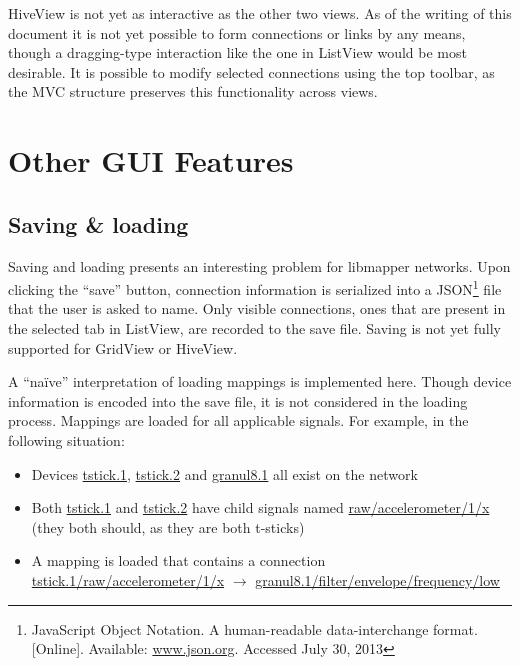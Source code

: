 HiveView is not yet as interactive as the other two views. As of the writing of this document it is not yet possible to form connections or links by any means, though a dragging-type interaction like the one in ListView would be most desirable. It is possible to modify selected connections using the top toolbar, as the MVC structure preserves this functionality across views.



\section{Other GUI Features} %
\label{sec:other_gui_features}

	\subsection{Saving \& loading} %
	\label{sec:saving_and_loading}

Saving and loading presents an interesting problem for libmapper networks. Upon clicking the ``save'' button, connection information is serialized into a JSON\footnote{JavaScript Object Notation. A human-readable data-interchange format. [Online]. Available: \url{www.json.org}. Accessed July 30, 2013} file that the user is asked to name. Only visible connections, ones that are present in the selected tab in ListView, are recorded to the save file. Saving is not yet fully supported for GridView or HiveView.

A ``na\"{i}ve'' interpretation of loading mappings is implemented here. Though device information is encoded into the save file, it is not considered in the loading process. Mappings are loaded for all applicable signals. For example, in the following situation:

\begin{itemize}
	\item Devices \url{tstick.1}, \url{tstick.2} and \url{granul8.1} all exist on the network
	\item Both \url{tstick.1} and \url{tstick.2} have child signals named \url{raw/accelerometer/1/x} (they both should, as they are both t-sticks)
	\item A mapping is loaded that contains a connection \url{tstick.1/raw/accelerometer/1/x} $\rightarrow$ \url{granul8.1/filter/envelope/frequency/low}
\end{itemize}

